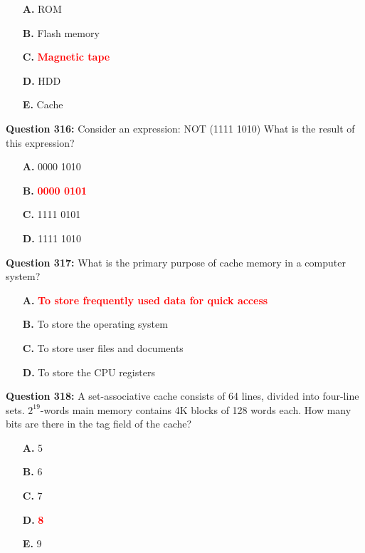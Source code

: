 \documentclass[12pt,a4paper]{article}
\begin{document}
\begin{itemize}
    \item[\textbf{A.}] ROM
    \item[\textbf{B.}] Flash memory
    \item[\textbf{C.}] \textcolor{red}{\textbf{Magnetic tape}}
    \item[\textbf{D.}] HDD
    \item[\textbf{E.}] Cache
\end{itemize}

\vspace{0.5cm}

\textbf{Question 316:} Consider an expression: NOT (1111 1010) What is the result of this expression?

\begin{itemize}
    \item[\textbf{A.}] 0000 1010
    \item[\textbf{B.}] \textcolor{red}{\textbf{0000 0101}}
    \item[\textbf{C.}] 1111 0101
    \item[\textbf{D.}] 1111 1010
\end{itemize}

\vspace{0.5cm}

\textbf{Question 317:} What is the primary purpose of cache memory in a computer system?

\begin{itemize}
    \item[\textbf{A.}] \textcolor{red}{\textbf{To store frequently used data for quick access}}
    \item[\textbf{B.}] To store the operating system
    \item[\textbf{C.}] To store user files and documents
    \item[\textbf{D.}] To store the CPU registers
\end{itemize}

\vspace{0.5cm}

\textbf{Question 318:} A set-associative cache consists of 64 lines, divided into four-line sets. $2^{19}$-words main memory contains 4K blocks of 128 words each. How many bits are there in the tag field of the cache?

\begin{itemize}
    \item[\textbf{A.}] 5
    \item[\textbf{B.}] 6
    \item[\textbf{C.}] 7
    \item[\textbf{D.}] \textcolor{red}{\textbf{8}}
    \item[\textbf{E.}] 9
\end{itemize}
\end{document}

